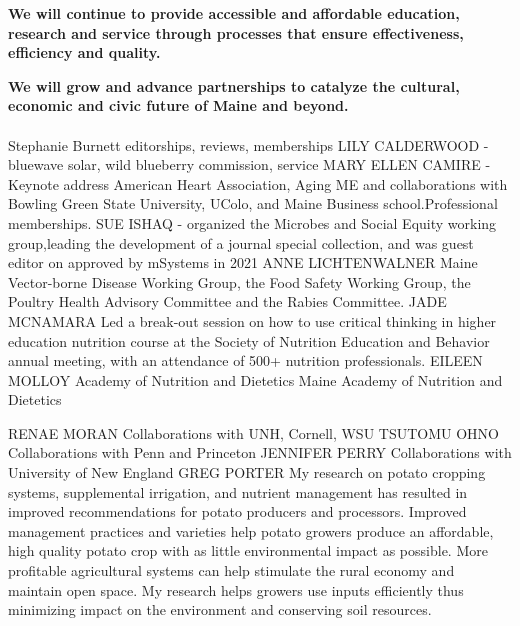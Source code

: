 \documentclass[11pt]{article}
\begin{document}
\begin{description}[topsep=0pt, noitemsep]
\begin{description}[topsep=11pt, noitemsep]
\end{description}
\item[\textbf{2.}] \textbf{We will continue to provide accessible and affordable education, research and service through processes that ensure effectiveness, efficiency and quality.}
\begin{description}[topsep=11pt, noitemsep]
\item[\textbf{2.1}] \textbf{We will grow and advance partnerships to catalyze the cultural, economic and civic future of Maine and beyond.}\\~\\
	Stephanie Burnett editorships, reviews, memberships
	LILY CALDERWOOD - bluewave solar, wild blueberry commission, service
	MARY ELLEN CAMIRE - Keynote address American Heart Association, Aging ME and collaborations with Bowling Green State University, UColo, and Maine Business school.Professional memberships.
	SUE ISHAQ - organized the Microbes and Social Equity working group,leading the development of a journal special collection, and was guest editor on  approved by mSystems in 2021 
	ANNE LICHTENWALNER Maine Vector-borne Disease Working Group, the Food Safety Working Group, the Poultry Health Advisory Committee and the Rabies Committee.
		JADE MCNAMARA Led a break-out session on how to use critical thinking in higher education nutrition course at the Society of Nutrition Education and Behavior annual meeting, with an attendance of 500+ nutrition professionals.
EILEEN MOLLOY Academy of Nutrition and Dietetics
Maine Academy of Nutrition and Dietetics

RENAE MORAN Collaborations with UNH, Cornell, WSU
TSUTOMU OHNO Collaborations with Penn and Princeton
JENNIFER PERRY Collaborations with University of New England 
GREG PORTER My research on potato cropping systems, supplemental irrigation, and nutrient management has resulted in improved recommendations for potato producers and processors.  Improved management practices and varieties help potato growers produce an affordable, high quality potato crop with as little environmental impact as possible.  More profitable agricultural systems can help stimulate the rural economy and maintain open space. My research helps growers use inputs efficiently thus minimizing impact on the environment and conserving soil resources.


\end{description}
\end{description}
\end{document}
